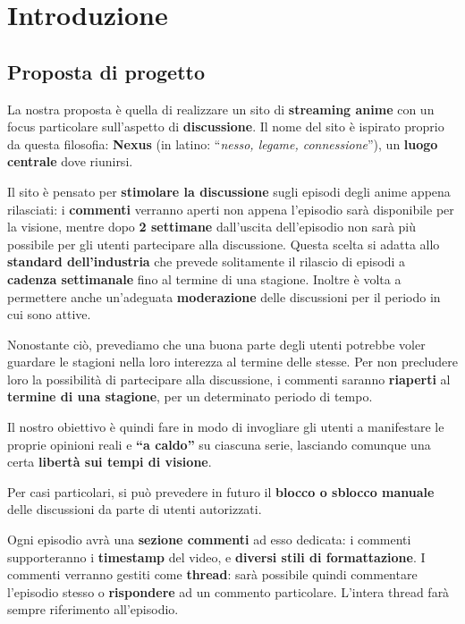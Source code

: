 \section{Introduzione}
\subsection{Proposta di progetto}
La nostra proposta è quella di realizzare un sito di \textbf{streaming anime} con un focus particolare sull'aspetto di \textbf{discussione}. Il nome del sito è ispirato proprio da questa filosofia: \textbf{Nexus} (in latino: ``\textit{nesso, legame, connessione}''), un \textbf{luogo centrale} dove riunirsi.

Il sito è pensato per \textbf{stimolare la discussione} sugli episodi degli anime appena rilasciati: i \textbf{commenti} verranno aperti non appena l'episodio sarà disponibile per la visione, mentre dopo \textbf{2 settimane} dall'uscita dell'episodio non sarà più possibile per gli utenti partecipare alla discussione. Questa scelta si adatta allo \textbf{standard dell'industria} che prevede solitamente il rilascio di episodi a \textbf{cadenza settimanale} fino al termine di una stagione. Inoltre è volta a permettere anche un'adeguata \textbf{moderazione} delle discussioni per il periodo in cui sono attive.

Nonostante ciò, prevediamo che una buona parte degli utenti potrebbe voler guardare le stagioni nella loro interezza al termine delle stesse. Per non precludere loro la possibilità di partecipare alla discussione, i commenti saranno \textbf{riaperti} al \textbf{termine di una stagione}, per un determinato periodo di tempo.

Il nostro obiettivo è quindi fare in modo di invogliare gli utenti a manifestare le proprie opinioni reali e \textbf{``a caldo''} su ciascuna serie, lasciando comunque una certa \textbf{libertà sui tempi di visione}.

Per casi particolari, si può prevedere in futuro il \textbf{blocco o sblocco manuale} delle discussioni da parte di utenti autorizzati.

Ogni episodio avrà una \textbf{sezione commenti} ad esso dedicata: i commenti supporteranno i \textbf{timestamp} del video, e \textbf{diversi stili di formattazione}. I commenti verranno gestiti come \textbf{thread}: sarà possibile quindi commentare l'episodio stesso o \textbf{rispondere} ad un commento particolare. L'intera thread farà sempre riferimento all'episodio.

